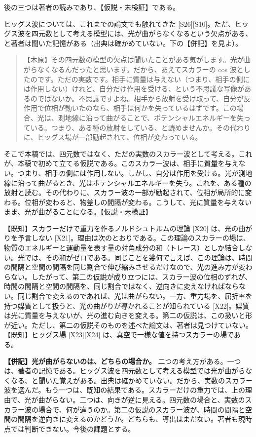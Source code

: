 \documentclass[
  a4paper,
]{ltjsarticle}
\begin{document}
後の三つは著者の読みであり、【仮説・未検証】である。

ヒッグス波については、これまでの論文でも触れてきた
{[}S26{]}{[}S10{]}。ただ、ヒッグス波を四元数として考える模型には、光が曲がらなくなるという欠点がある、と著者は聞いた記憶がある（出典は確かめていない。下の【併記】を見よ）。

\begin{quote}
【木原】その四元数の模型の欠点は聞いたことがある気がします。光が曲がらなくなるんだったと思います。だから、あえてスカラーの
cos
波としたのです。ただの実数です。相手に質量は与えない（つまり、相手の側には作用しない）けれど、自分だけ作用を受ける、という不思議な写像があるのではないか。不思議ですよね。相手から放射を受け取って、自分が反作用で位相が動いたのなら、相手は何かを失っているはずです。この場合、光は、測地線に沿って曲がることで、ポテンシャルエネルギーを失っている。つまり、ある種の放射をしている、と読めませんか。その代わりに、ヒッグス場が一部励起されて、位相が変わっている。
\end{quote}

そこで本稿では、四元数ではなく、ただの実数のスカラー波として考える。これが、本稿で初めて立てる仮説である。このスカラー波は、相手に質量を与えない。つまり、相手の側には作用しない。しかし、自分は作用を受ける。光が測地線に沿って曲がるとき、光はポテンシャルエネルギーを失う。これを、ある種の放射と読む。その代わりに、スカラー波の一部が励起されて、位相が局所的に変わる。位相が変わると、物差しの間隔が変わる。こうして、光に質量を与えないまま、光が曲がることになる。【仮説・未検証】

【既知】スカラーだけで重力を作るノルドシュトルムの理論 {[}X20{]}
は、光の曲がりを予言しない
{[}X21{]}。理由は次のとおりである。この理論のスカラーの場は、物質のエネルギーと運動量を表す量の対角成分の和（トレース）としか結合しない。光では、その和がゼロである。同じことを幾何で言えば、この理論は、時間の間隔と空間の間隔を同じ割合で伸び縮みさせるだけなので、光の進み方が変わらない。したがって、第二の仮説が成り立つには、スカラー波の位相のずれが、時間の間隔と空間の間隔を、同じ割合ではなく、逆向きに変えなければならない。同じ割合で変えるのであれば、光は曲がらない。一方、重力場を、屈折率を持つ媒質として扱うと、光の曲がりが導かれることが知られている
{[}X22{]}。媒質は光に質量を与えないが、光の進む向きを変える。第二の仮説は、この扱いと形が近い。ただし、第二の仮説そのものを述べた論文は、著者は見つけていない。【既知】ヒッグス場
{[}X23{]}{[}X24{]} は、真空で一様な値を持つスカラーの場である。

\textbf{【併記】光が曲がらないのは、どちらの場合か。}
二つの考え方がある。一つは、著者の記憶である。ヒッグス波を四元数として考える模型では光が曲がらなくなる、と聞いた覚えがある。出典は確かめていない。だから、実数のスカラー波を選んだ。もう一つは、既知の結果である。スカラーだけの重力では、上の理由で、光が曲がらない。二つは、向きが逆に見える。四元数の場合と、実数のスカラー波の場合で、何が違うのか。第二の仮説のスカラー波が、時間の間隔と空間の間隔を逆向きに変えるのかどうか。どちらも、導出はまだない。著者も現時点では判断できない。今後の課題とする。
\end{document}

